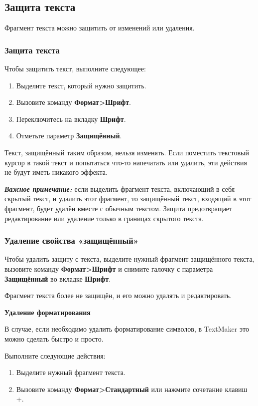 ﻿\documentclass[a4paper,10pt]{article}
\begin{document}
\subsection{Защита текста} \label{sec:защитатекста}
Фрагмент текста можно защитить от изменений или удаления.
\subsubsection{Защита текста}
Чтобы защитить текст, выполните следующее:
\begin{enumerate}
 \item Выделите текст, который нужно защитить.
 \item Вызовите команду \textbf{Формат>Шрифт}.
 \item Переключитесь на вкладку \textbf{Шрифт}.
 \item Отметьте параметр \textbf{Защищённый}.
\end{enumerate}
Текст, защищённый таким образом, нельзя изменять. Если поместить текстовый курсор в такой текст и попытаться что-то напечатать или удалить, эти действия не будут иметь никакого эффекта.

\begin{mdframed}[backgroundcolor=blue!10]
\textbf{\textit{Важное примечание:}} если выделить фрагмент текста, включающий в себя скрытый текст, и удалить этот фрагмент, то защищённый текст, входящий в этот фрагмент, будет удалён вместе с обычным текстом. Защита предотвращает редактирование или удаление только в границах скрытого текста.
\end{mdframed}

\subsubsection{Удаление свойства «защищённый»} 
Чтобы удалить защиту с текста, выделите нужный фрагмент защищённого текста, вызовите команду \textbf{Формат>Шрифт} и снимите галочку с параметра \textbf{Защищённый} во вкладке \textbf{Шрифт}.

Фрагмент текста более не защищён, и его можно удалять и редактировать.

\textbf{Удаление форматирования}

В случае, если необходимо удалить форматирование символов, в TextMaker это можно сделать быстро и просто.

Выполните следующие действия:
\begin{enumerate}
 \item Выделите нужный фрагмент текста.
 \item Вызовите команду \textbf{Формат>Стандартный} или нажмите сочетание клавиш +.
\end{enumerate}
\end{document}
